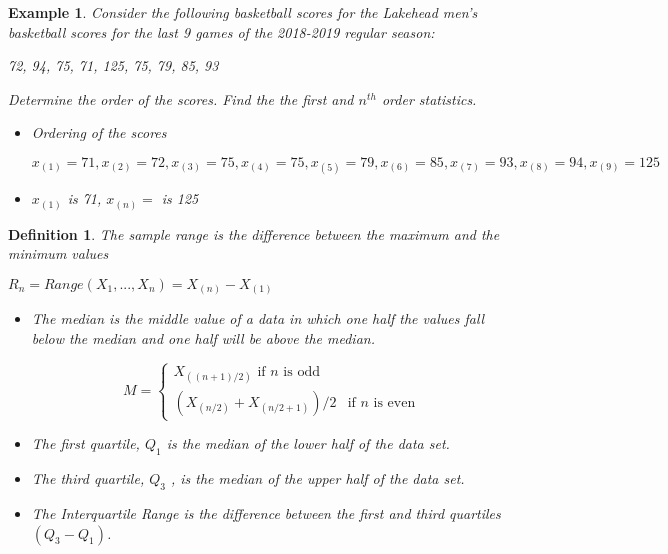 \documentclass[11pt,a4paper]{article}
\theoremstyle{plain}
\newtheorem{de}[fact]{Definition}
\newtheorem{exmp}[fact]{Example}
\begin{document}
\begin{exmp}
Consider the following basketball scores for the Lakehead men's basketball scores for the last 9 games of the 2018-2019 regular season: 
\begin{center}
72, 94, 75, 71, 125, 75, 79, 85, 93
\end{center}
Determine the order of the scores. Find the the first and $n^{th}$ order statistics.
\begin{itemize}
  \item Ordering of the scores
  \begin{center}$x_{(1)}=71, x_{(2)}=72,x_{(3)}= 75,x_{(4)}= 75,  x_{(5)}=79, x_{(6)}=85,x_{(7)}= 93,x_{(8)}= 94,x_{(9)}= 125$
  \end{center}
  \item $x_{(1)}$ is 71, $x_{(n)}=$ is 125 
 
\end{itemize}

\end{exmp}

\newpage
\begin{de}
The sample range is the difference between the maximum and the minimum values
\begin{center}
$R_n=Range(X_1,...,X_n)=X_{(n)}-X_{(1)}$
\end{center}
\begin{itemize}
\item The median is the middle value of a data in which one half the values fall below the median and one half will be above the median.
\begin{center}
\[
     M=\left\{
                \begin{array}{ll}
                  X_{((n+1)/2)}\text{ if $n$ is odd}\\
                  (X_{(n/2)}+X_{(n/2+1)})/2 &\text{if $n$ is even}
                \end{array}
              \right.
  \]

\end{center}
  \item The first quartile, $Q_1$ is the median of the lower half of the data set.
  \item The third quartile, $Q_3$ , is the median of the upper half of the data set. 
  \item The Interquartile Range is the difference between the first and third quartiles $(Q_3-Q_1)$.
  
\end{itemize}

\end{de}
\end{document}
